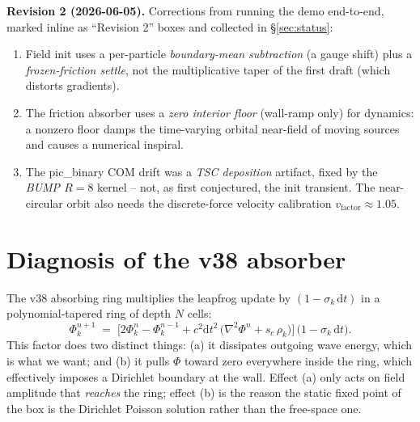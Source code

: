\documentclass[11pt,a4paper]{article}
\newcommand{\dd}{\mathrm{d}}
\begin{document}
\begin{shaded}
\textbf{Revision 2 (2026-06-05).}  Corrections from running the demo
end-to-end, marked inline as ``Revision 2'' boxes and collected in
\S\ref{sec:status}:
\begin{enumerate}[leftmargin=*,nosep]
  \item Field init uses a per-particle \emph{boundary-mean subtraction}
    (a gauge shift) plus a \emph{frozen-friction settle}, not the
    multiplicative taper of the first draft (which distorts gradients).
  \item The friction absorber uses a \emph{zero interior floor}
    (wall-ramp only) for dynamics: a nonzero floor damps the
    time-varying orbital near-field of moving sources and causes a
    numerical inspiral.
  \item The pic\_binary COM drift was a \emph{TSC deposition} artifact,
    fixed by the \emph{BUMP $R=8$} kernel -- not, as first conjectured,
    the init transient.  The near-circular orbit also needs the
    discrete-force velocity calibration $v_\text{factor}\approx 1.05$.
\end{enumerate}
\end{shaded}

\tableofcontents

\vspace{0.5cm}

\section{Diagnosis of the v38 absorber}

The v38 absorbing ring multiplies the leapfrog update by
$(1 - \sigma_k\,\dd t)$ in a polynomial-tapered ring of depth $N$
cells:
\begin{equation}
  \Phi_k^{n+1} \;=\; \bigl[2\Phi_k^n - \Phi_k^{n-1}
                       + c^2\dd t^2\,\bigl(\nabla^2\Phi^n + s_c\,\rho_k\bigr)\bigr]
                  \,\bigl(1 - \sigma_k\,\dd t\bigr).
\end{equation}
This factor does two distinct things: (a) it dissipates outgoing wave
energy, which is what we want; and (b) it pulls $\Phi$ toward zero
everywhere inside the ring, which effectively imposes a Dirichlet
boundary at the wall.  Effect (a) only acts on field amplitude that
\emph{reaches} the ring; effect (b) is the reason the static
fixed point of the box is the Dirichlet Poisson solution rather
than the free-space one.
\end{document}
